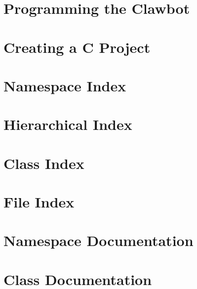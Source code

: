 \let\mypdfximage\pdfximage\def\pdfximage{\immediate\mypdfximage}\documentclass[twoside]{book}
\newcommand{\+}{\discretionary{\mbox{\scriptsize$\hookleftarrow$}}{}{}}
\begin{document}
\chapter{Programming the Clawbot}
\label{md_docs_tutorials_walkthrough_clawbot}

\chapter{Creating a C Project}
\label{md_docs_tutorials_walkthrough_creating-c-project}

\chapter{Namespace Index}

\chapter{Hierarchical Index}

\chapter{Class Index}

\chapter{File Index}

\chapter{Namespace Documentation}






\chapter{Class Documentation}




















\end{document}
